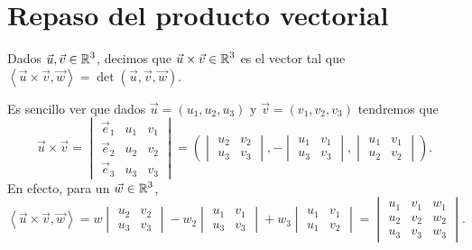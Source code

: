 \chapter{Repaso del producto vectorial}
\begin{definition} 
Dados $\displaystyle \vec{u}, \vec{v} \in \mathbb{R}^{3} $, decimos que $\displaystyle \vec{u} \times \vec{v} \in \mathbb{R}^{3} $ es el vector tal que $\displaystyle \left\langle \vec{u} \times \vec{v}, \vec{w} \right\rangle =\det\left(\vec{u}, \vec{v}, \vec{w}\right) $.
\end{definition}
Es sencillo ver que dados $\displaystyle \vec{u}=\left(u_{1}, u_{2}, u_{3}\right) $ y $\displaystyle \vec{v}=\left(v_{1}, v_{2}, v_{3}\right) $ tendremos que 
\[\vec{u} \times \vec{v} = \begin{vmatrix} \vec{e}_{1} & u_{1} & v_{1} \\ \vec{e}_{2} & u_{2} & v_{2} \\ \vec{e}_{3} & u_{3} & v_{3} \end{vmatrix}=\left(\begin{vmatrix} u_{2} & v_{2} \\ u_{3} & v_{3} \end{vmatrix} , - \begin{vmatrix} u_{1} & v_{1} \\ u_{3} & v_{3} \end{vmatrix} , \begin{vmatrix} u_{1} & v_{1} \\ u_{2} & v_{2} \end{vmatrix} \right) .\]
En efecto, para un $\displaystyle \vec{w} \in \mathbb{R}^{3} $, 
\[\left\langle \vec{u} \times \vec{v}, \vec{w} \right\rangle =w\begin{vmatrix} u_{2} & v_{2} \\ u_{3} & v_{3} \end{vmatrix}  - w_{2} \begin{vmatrix} u_{1} & v_{1} \\ u_{3} & v_{3}  \end{vmatrix} +w_{3}\begin{vmatrix} u_{1} & v_{1} \\ u_{1} & v_{2} \end{vmatrix} =\begin{vmatrix} u_{1} & v_{1} & w_{1} \\ u_{2} & v_{2} & w_{2} \\ u_{3} & v_{3} & w_{3} \end{vmatrix}  .\]
